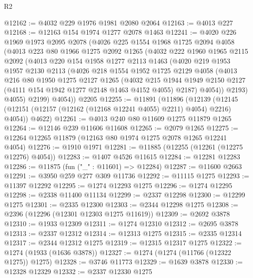 \begin{lexlean}{R2}
\begin{coremodule}
@12162 := @4032 @229 @1976 @1981 @2080 @2064
@12163 := @4013 @227
@12168 := @12163 @154 @1974 @1277 @2078 @1463
@12241 := @4020
    @226
    @1969
    @1973
    @2095
    @2078
    (@4026
      @225
      @1554
      @1968
      @1725
      @2094
      @4058
      (@4013
        @223
        @80
        @1966
        @1275
        @2092
        @1265
        (@4032
          @222
          @1960
          @1965
          @2115
          @2092
          (@4013
            @220
            @154
            @1958
            @1277
            @2113
            @1463
            (@4020
              @219
              @1953
              @1957
              @2130
              @2113
              (@4026
                @218
                @1554
                @1952
                @1725
                @2129
                @4058
                (@4013
                  @216
                  @80
                  @1950
                  @1275
                  @2127
                  @1265
                  (@4032
                    @215
                    @1944
                    @1949
                    @2150
                    @2127
                    (@4111 @154 @1942 @1277 @2148 @1463 @4152 @4055)
                    @2187)
                  @4054))
              @2193)
            @4055)
          @2199)
        @4054))
    @2205
@12255 := @11891
    (@11896
      (@12139 (@12145 (@12151 (@12157 (@12162 (@12168 @12241 @4055) @2211) @4054) @2216) @4054))
      @4622)
@12261 := @4013 @240 @80 @11609 @1275 @11879 @1265
@12264 := @12146 @239 @11606 @11608
@12265 := @2079 @1265
@12275 := @12264 @12265 @11879 (@12163 @80 @1974 @1275 @2078 @1265 @12241 @4054)
@12276 := @1910 @1971
@12281 := @11885 (@12255 (@12261 (@12275 @12276) @4054))
@12283 := @1407 @4526 @11615
@12284 := @12281 @12283
@12286 := @11875 (fun ("_" : @11601) => @12284)
@12287 := @11600 @2663
@12291 := @3950 @259 @277 @309 @11736
@12292 := @11115 @1275
@12293 := @11397 @12292
@12295 := @1274 @12293 @1275
@12296 := @1274 @12295
@12298 := @2338 @11400 @11134
@12299 := @2337 @12298
@12300 := @12299 @1275
@12301 := @2335 @12300
@12303 := @2344 @12298 @1275
@12308 := @2396 (@12296 (@12301 @12303 @1275 @11619))
@12309 := @2692 @3878
@12310 := @1933 @12309
@12311 := @1274 @12310
@12312 := @2695 @3878
@12313 := @2337 @12312
@12314 := @12313 @1275
@12315 := @2335 @12314
@12317 := @2344 @12312 @1275
@12319 := @12315 @12317 @1275
@12322 := @1274 (@1933 (@1636 @3878))
@12327 := @1274 (@1274 (@11766 (@12322 @1275)) @1275)
@12328 := @3746 @11773
@12329 := @1639 @3878
@12330 := @12328 @12329
@12332 := @2337 @12330 @1275

\end{coremodule}
\end{lexlean}
